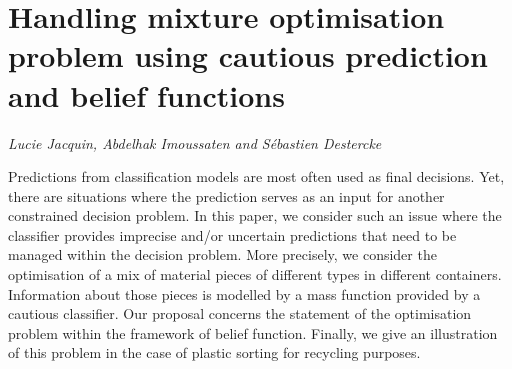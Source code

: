 \documentclass[../booklet.tex]{subfiles}
\begin{document}
\section[Handling mixture optimisation problem using cautious prediction and belief functions. {\it Lucie Jacquin, Abdelhak Imoussaten and Sébastien Destercke}]{Handling mixture optimisation problem using cautious prediction and belief functions}
  

\begin{center}
  {\it Lucie Jacquin, Abdelhak Imoussaten and Sébastien Destercke}
\end{center}

\vskip 0.8cm



Predictions from classification models are most often used as final decisions. Yet, there are situations where the prediction serves as an input for another constrained decision problem. In this paper, we consider such an issue where the classifier provides imprecise and/or uncertain predictions that need to be managed within the decision problem. More precisely, we consider the optimisation of a mix of material pieces of different types in different containers. Information about those pieces is modelled by a mass function provided by a cautious classifier. Our proposal concerns the statement of the optimisation problem within the framework of belief function. Finally, we give an illustration of this problem in the case of plastic sorting for recycling purposes.

\end{document}
